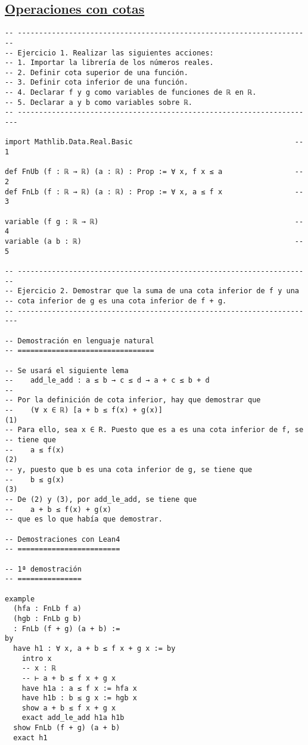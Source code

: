 \subsection{\href{./src/Logica/Operaciones\_con\_cotas.lean}{Operaciones con cotas}}
\label{sec:org24f5823}
\begin{verbatim}
-- ---------------------------------------------------------------------
-- Ejercicio 1. Realizar las siguientes acciones:
-- 1. Importar la librería de los números reales.
-- 2. Definir cota superior de una función.
-- 3. Definir cota inferior de una función.
-- 4. Declarar f y g como variables de funciones de ℝ en ℝ.
-- 5. Declarar a y b como variables sobre ℝ.
-- ----------------------------------------------------------------------

import Mathlib.Data.Real.Basic                                      -- 1

def FnUb (f : ℝ → ℝ) (a : ℝ) : Prop := ∀ x, f x ≤ a                 -- 2
def FnLb (f : ℝ → ℝ) (a : ℝ) : Prop := ∀ x, a ≤ f x                 -- 3

variable (f g : ℝ → ℝ)                                              -- 4
variable (a b : ℝ)                                                  -- 5

-- ---------------------------------------------------------------------
-- Ejercicio 2. Demostrar que la suma de una cota inferior de f y una
-- cota inferior de g es una cota inferior de f + g.
-- ----------------------------------------------------------------------

-- Demostración en lenguaje natural
-- ================================

-- Se usará el siguiente lema
--    add_le_add : a ≤ b → c ≤ d → a + c ≤ b + d
--
-- Por la definición de cota inferior, hay que demostrar que
--    (∀ x ∈ ℝ) [a + b ≤ f(x) + g(x)]                                  (1)
-- Para ello, sea x ∈ R. Puesto que es a es una cota inferior de f, se
-- tiene que
--    a ≤ f(x)                                                         (2)
-- y, puesto que b es una cota inferior de g, se tiene que
--    b ≤ g(x)                                                         (3)
-- De (2) y (3), por add_le_add, se tiene que
--    a + b ≤ f(x) + g(x)
-- que es lo que había que demostrar.

-- Demostraciones con Lean4
-- ========================

-- 1ª demostración
-- ===============

example
  (hfa : FnLb f a)
  (hgb : FnLb g b)
  : FnLb (f + g) (a + b) :=
by
  have h1 : ∀ x, a + b ≤ f x + g x := by
    intro x
    -- x : ℝ
    -- ⊢ a + b ≤ f x + g x
    have h1a : a ≤ f x := hfa x
    have h1b : b ≤ g x := hgb x
    show a + b ≤ f x + g x
    exact add_le_add h1a h1b
  show FnLb (f + g) (a + b)
  exact h1


\end{verbatim}
